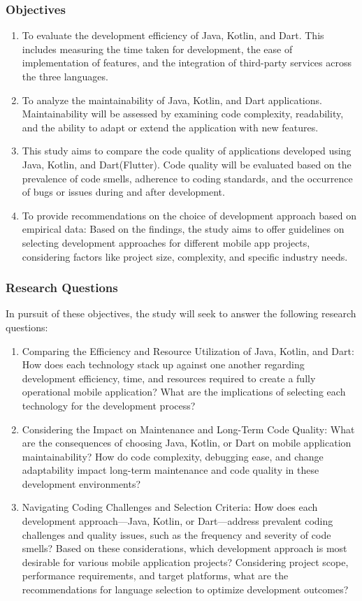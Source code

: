 \subsubsection*{Objectives}
\begin{enumerate}
    \item To evaluate the development efficiency of Java, Kotlin, and Dart. This includes measuring the time taken for development, the ease of implementation of features, and the integration of third-party services across the three languages.
    \item To analyze the maintainability of Java, Kotlin, and Dart applications.  Maintainability will be assessed by examining code complexity, readability, and the ability to adapt or extend the application with new features.
    \item This study aims to compare the code quality of applications developed using Java, Kotlin, and Dart(Flutter). Code quality will be evaluated based on the prevalence of code smells, adherence to coding standards, and the occurrence of bugs or issues during and after development.
    \item To provide recommendations on the choice of development approach based on empirical data: Based on the findings, the study aims to offer guidelines on selecting development approaches for different mobile app projects, considering factors like project size, complexity, and specific industry needs.
\end{enumerate}
\subsubsection*{Research Questions}
In pursuit of these objectives, the study will seek to answer the following research questions:
\begin{enumerate}
    \item Comparing the Efficiency and Resource Utilization of Java, Kotlin, and Dart: How does each technology stack up against one another regarding development efficiency, time, and resources required to create a fully operational mobile application? What are the implications of selecting each technology for the development process?
    \item Considering the Impact on Maintenance and Long-Term Code Quality: What are the consequences of choosing Java, Kotlin, or Dart on mobile application maintainability? How do code complexity, debugging ease, and change adaptability impact long-term maintenance and code quality in these development environments?
    \item Navigating Coding Challenges and Selection Criteria: How does each development approach—Java, Kotlin, or Dart—address prevalent coding challenges and quality issues, such as the frequency and severity of code smells? Based on these considerations, which development approach is most desirable for various mobile application projects? Considering project scope, performance requirements, and target platforms, what are the recommendations for language selection to optimize development outcomes?
\end{enumerate}
